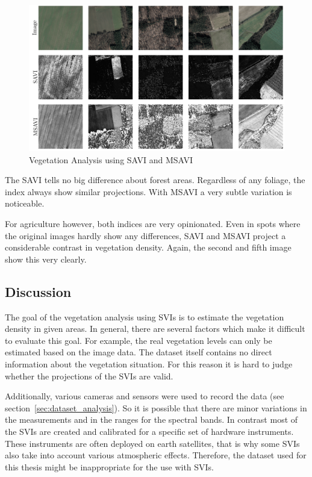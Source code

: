 \begin{figure}[h]
    \centering
    \includegraphics[width=\textwidth]{images/vegetation/savi_msavi}
    \caption{Vegetation Analysis using SAVI and MSAVI}
    \label{fig:vegetation_savi_examples}
\end{figure}

The SAVI tells no big difference about forest areas. Regardless of any foliage, the index always show similar projections. With MSAVI a very subtle variation is noticeable.

For agriculture however, both indices are very opinionated. Even in spots where the original images hardly show any differences, SAVI and MSAVI project a considerable contrast in vegetation density. Again, the second and fifth image show this very clearly.

\subsection{Discussion}
The goal of the vegetation analysis using SVIs is to estimate the vegetation density in given areas. In general, there are several factors which make it difficult to evaluate this goal. For example, the real vegetation levels can only be estimated based on the image data. The dataset itself contains no direct information about the vegetation situation. For this reason it is hard to judge whether the projections of the SVIs are valid.

Additionally, various cameras and sensors were used to record the data (see section~\ref{sec:dataset_analysis}). So it is possible that there are minor variations in the measurements and in the ranges for the spectral bands. In contrast most of the SVIs are created and calibrated for a specific set of hardware instruments. These instruments are often deployed on earth satellites, that is why some SVIs also take into account various atmospheric effects. Therefore, the dataset used for this thesis might be inappropriate for the use with SVIs.

